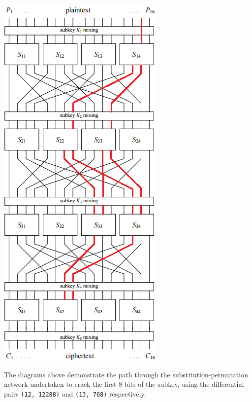 \documentclass[british,10pt,a4paper]{article}
\begin{document}
\begin{appendices}
  \includegraphics{13,768}

  \hspace{1cm}
  The diagrams above demonstrate the path through the substitution-permutation network undertaken to crack the first 8 bits of the subkey, using the differential pairs \lstinline{(12, 12288)} and \lstinline{(13, 768)} respectively.
  \clearpage
  

\end{appendices}
\end{document}
